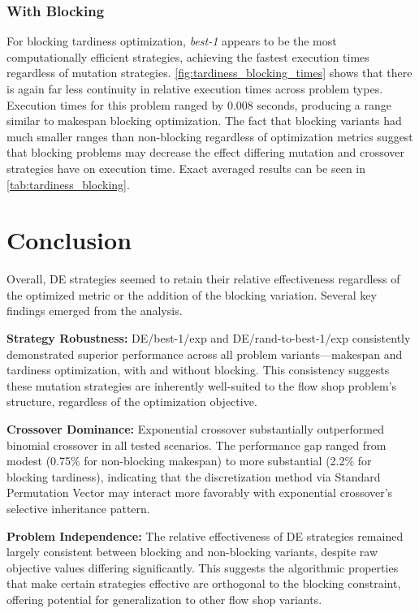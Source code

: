 \documentclass{article}
\begin{document}
\subsubsection{With Blocking}



For blocking tardiness optimization, \textit{best-1} appears to be the most computationally efficient strategies, achieving the fastest execution times regardless of mutation strategies. \cref{fig:tardiness_blocking_times} shows that there is again far less continuity in relative execution times across problem types. Execution times for this problem ranged by 0.008 seconds, producing a range similar to makespan blocking optimization. The fact that blocking variants had much smaller ranges than non-blocking regardless of optimization metrics suggest that blocking problems may decrease the effect differing mutation and crossover strategies have on execution time. Exact averaged results can be seen in \cref{tab:tardiness_blocking}.





\section{Conclusion}

Overall, DE strategies seemed to retain their relative effectiveness regardless of the optimized metric or the addition of the blocking variation. Several key findings emerged from the analysis.

\textbf{Strategy Robustness:} DE/best-1/exp and DE/rand-to-best-1/exp consistently demonstrated superior performance across all problem variants---makespan and tardiness optimization, with and without blocking. This consistency suggests these mutation strategies are inherently well-suited to the flow shop problem's structure, regardless of the optimization objective.

\textbf{Crossover Dominance:} Exponential crossover substantially outperformed binomial crossover in all tested scenarios. The performance gap ranged from modest (0.75\% for non-blocking makespan) to more substantial (2.2\% for blocking tardiness), indicating that the discretization method via Standard Permutation Vector may interact more favorably with exponential crossover's selective inheritance pattern.

\textbf{Problem Independence:} The relative effectiveness of DE strategies remained largely consistent between blocking and non-blocking variants, despite raw objective values differing significantly. This suggests the algorithmic properties that make certain strategies effective are orthogonal to the blocking constraint, offering potential for generalization to other flow shop variants.
\end{document}
